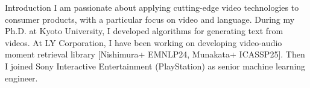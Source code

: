 \begin{rSection}{Introduction}
I am passionate about applying cutting-edge video technologies to consumer products, with a particular focus on video and language.
During my Ph.D. at Kyoto University, I developed algorithms for generating text from videos. At LY Corporation, I have been working on developing video-audio moment retrieval library [Nishimura+ EMNLP24, Munakata+ ICASSP25]. Then I joined Sony Interactive Entertainment (PlayStation) as senior machine learning engineer.
\end{rSection}
\vspace{-0.5em}